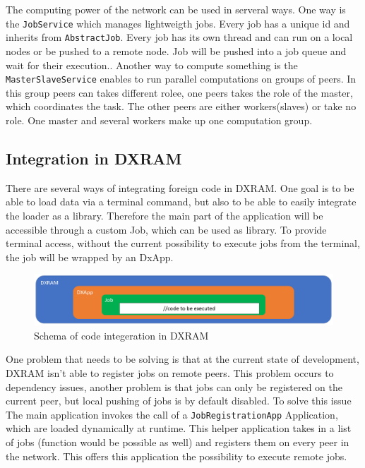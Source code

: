 The computing power of the network can be used in serveral ways. One way is the \texttt{JobService} which manages lightweigth jobs. Every job has a unique id and inherits from \texttt{AbstractJob}. Every job has its own thread and can run on a local nodes or be pushed to a remote node. Job will be pushed into a job queue and wait for their execution.. Another way to compute something is the \texttt{MasterSlaveService} enables to run parallel computations on groups of peers. In this group peers can takes different rolee, one peers takes the role of the master, which coordinates the task. The other peers are either workers(slaves) or take no role. One master and several workers make up one computation group.\cite{Beineke.20180714,dxramoverview}

\subsection{Integration in DXRAM}
There are several ways of integrating foreign code in DXRAM. One goal is to be able to load data via a terminal command, but also to be able to easily integrate the loader as a library. Therefore the main part of the application will be accessible through a custom Job, which can be used as library. To provide terminal access, without the current possibility to execute jobs from the terminal, the job will be wrapped by an DxApp.

\begin{figure}[H]
	\centering
	\includegraphics[width=1.0\linewidth]{img/schema.png}
	\caption{Schema of  code integeration in DXRAM}
	\label{topology}
\end{figure}

One problem that needs to be solving is that at the current state of development, DXRAM isn't able to register jobs on remote peers. This problem occurs to dependency issues, another problem is that jobs can only be registered on the current peer, but local pushing of jobs is by default disabled. To solve this issue The main application invokes the call of a \texttt{JobRegistrationApp} Application, which are loaded dynamically at runtime. This helper application takes in a list of jobs (function would be possible as well) and registers them on every peer in the network. This offers this application the possibility to execute remote jobs.

